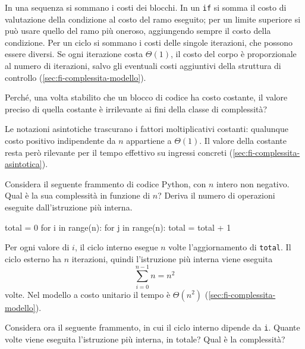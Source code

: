 In una sequenza si sommano i costi dei blocchi. In un
\lstinline|if| si somma il costo di valutazione della condizione
al costo del ramo eseguito; per un limite superiore si può
usare quello del ramo più oneroso, aggiungendo sempre il costo
della condizione. Per un ciclo si sommano i costi delle singole
iterazioni, che possono essere diversi. Se ogni iterazione
costa \(\Theta(1)\), il costo del corpo è proporzionale al
numero di iterazioni, salvo gli eventuali costi aggiuntivi
della struttura di controllo
(\cref{sec:fi-complessita-modello}).

\clearpage

\begin{exercise}
\label{ex:fi-esercizi-complessita-costante}
Perché, una volta stabilito che un blocco di codice ha costo
costante, il valore preciso di quella costante è irrilevante
ai fini della classe di complessità?
\end{exercise}

Le notazioni asintotiche trascurano i fattori moltiplicativi
costanti: qualunque costo positivo indipendente da \(n\)
appartiene a \(\Theta(1)\). Il valore della costante resta però
rilevante per il tempo effettivo su ingressi concreti
(\cref{sec:fi-complessita-asintotica}).

\begin{exercise}
\label{ex:fi-esercizi-complessita-cicli-quadrati}
Considera il seguente frammento di codice Python, con \(n\)
intero non negativo. Qual è la sua complessità in funzione
di \(n\)? Deriva il numero di operazioni eseguite
dall'istruzione più interna.
\end{exercise}

\begin{unipdcode}[language=Python]
total = 0
for i in range(n):
    for j in range(n):
        total = total + 1
\end{unipdcode}

Per ogni valore di \(i\), il ciclo interno esegue \(n\) volte
l'aggiornamento di \texttt{total}. Il ciclo esterno ha \(n\)
iterazioni, quindi l'istruzione più interna viene eseguita
\[
  \sum_{i=0}^{n-1}n=n^2
\]
volte. Nel modello a costo unitario il tempo è
\(\Theta(n^2)\) (\cref{sec:fi-complessita-modello}).

\begin{exercise}
\label{ex:fi-esercizi-complessita-ciclo-triangolare}
Considera ora il seguente frammento, in cui il ciclo interno
dipende da \lstinline|i|. Quante volte viene eseguita
l'istruzione più interna, in totale? Qual è la complessità?
\end{exercise}

